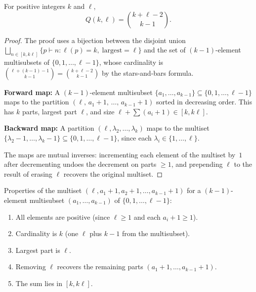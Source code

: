 \begin{proposition}
\label{prop.pars.qbinom.intro-count-binom}
\leantarget
\leanok
For positive integers $k$ and $\ell$,
\[
Q(k,\ell) = \binom{k+\ell-2}{k-1}.
\]
\end{proposition}

\begin{proof}
\leanok
The proof uses a bijection between the disjoint union
$\bigsqcup_{n\in [k, k\ell]} \{p \vdash n : \ell(p)=k,\;\text{largest}=\ell\}$
and the set of $(k-1)$-element multisubsets of $\{0,1,\ldots,\ell-1\}$, whose cardinality is
$\binom{\ell + (k-1) - 1}{k-1} = \binom{k+\ell-2}{k-1}$ by the stars-and-bars formula.

\textbf{Forward map:} A $(k-1)$-element multisubset $\{a_1,\ldots,a_{k-1}\}\subseteq\{0,1,\ldots,\ell-1\}$
maps to the partition $(\ell,\, a_1+1,\, \ldots,\, a_{k-1}+1)$ sorted in decreasing order.
This has $k$ parts, largest part $\ell$, and size $\ell + \sum(a_i+1) \in [k, k\ell]$.

\textbf{Backward map:} A partition $(\ell, \lambda_2,\ldots,\lambda_k)$ maps to the multiset
$\{\lambda_2-1, \ldots, \lambda_k-1\}\subseteq\{0,1,\ldots,\ell-1\}$,
since each $\lambda_i\in\{1,\ldots,\ell\}$.

The maps are mutual inverses:
incrementing each element of the multiset by~$1$ after decrementing undoes the decrement on parts $\ge 1$,
and prepending $\ell$ to the result of erasing $\ell$ recovers the original multiset.
\end{proof}

\begin{lemma}
\label{lem.pars.symToPartsMultiset-props}
\leanhelper
\leanok
Properties of the multiset $(\ell, a_1+1, a_2+1, \ldots, a_{k-1}+1)$
for a $(k-1)$-element multisubset $(a_1, \ldots, a_{k-1})$ of $\{0,1,\ldots,\ell-1\}$:
\begin{enumerate}
\item All elements are positive (since $\ell\ge 1$ and each $a_i+1\ge 1$).
\item Cardinality is $k$ (one $\ell$ plus $k-1$ from the multisubset).
\item Largest part is $\ell$.
\item Removing $\ell$ recovers the remaining parts $(a_1+1, \ldots, a_{k-1}+1)$.
\item The sum lies in $[k, k\ell]$.
\end{enumerate}
\end{lemma}

